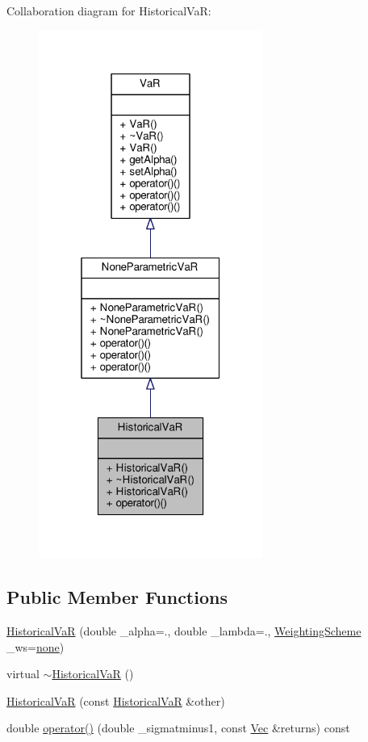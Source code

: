Collaboration diagram for Historical\+VaR\+:
\nopagebreak
\begin{figure}[H]
\begin{center}
\leavevmode
\includegraphics[width=208pt]{classHistoricalVaR__coll__graph}
\end{center}
\end{figure}
\subsection*{Public Member Functions}
\begin{DoxyCompactItemize}
\item 
\hyperlink{classHistoricalVaR_a2f98a84f410ee519c1d08cb3a4e5110f}{Historical\+VaR} (double \+\_\+alpha=., double \+\_\+lambda=., \hyperlink{var__model_8h_a05de9d7b6ad30cf17cd8f840666921de}{Weighting\+Scheme} \+\_\+ws=\hyperlink{var__model_8h_a05de9d7b6ad30cf17cd8f840666921deab7e4e0120a041dbe6528b050c04269e0}{none})
\item 
virtual \hyperlink{classHistoricalVaR_ac0b1889d5ba5e3a3efb0d23eaff525a5}{$\sim$\+Historical\+VaR} ()
\item 
\hyperlink{classHistoricalVaR_a75f77512a689c5f4826421e354f3053d}{Historical\+VaR} (const \hyperlink{classHistoricalVaR}{Historical\+VaR} \&other)
\item 
double \hyperlink{classHistoricalVaR_a472b04dc9a4c5989be0e7198bc9c4189}{operator()} (double \+\_\+sigmatminus1, const \hyperlink{compute__returns__eigen_8h_a1eb6a9306ef406d7975f3cbf2e247777}{Vec} \&returns) const
\end{DoxyCompactItemize}


